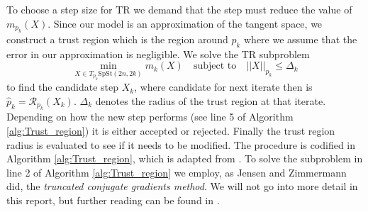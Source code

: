 To choose a step size for TR we demand that the step must reduce the value of $m_{p_{k}}(X)$. Since our model is an approximation of the tangent space, we construct a trust region which is the region around $p_{k}$ where we assume that the error in our approximation is negligible. We solve the TR subproblem
%
\begin{equation}\label{eq:TR_subproblem}
\operatorname*{min}_{X\in T_{p_{k}}\mathrm{SpSt}(2n, 2k)}m_{k}(X)\quad \text{subject to}\quad \lvert \lvert X \rvert  \rvert _{p_{k}}\leq \Delta_{k}
\end{equation}
%
to find the candidate step $X_{k}$,  where candidate for next iterate then is $\hat{p}_{k}=\mathcal{R}_{p_{k}}(X_{k})$. $\Delta_{k}$ denotes the radius of the trust region at that iterate. Depending on how the new step performs (see line 5 of Algorithm \ref{alg:Trust_region}) it is either accepted or rejected. Finally the trust region radius is evaluated to see if it needs to be modified. The procedure is codified in Algorithm \ref{alg:Trust_region}, which is adapted from \cite[Algorithm 3.3]{Boumal2023}. To solve the subproblem in line 2 of Algorithm \ref{alg:Trust_region} we employ, as Jensen and Zimmermann did, the \textit{truncated conjugate gradients method}. We will not go into more detail in this report, but further reading can be found in \cite[p.~131]{Boumal2023}.


